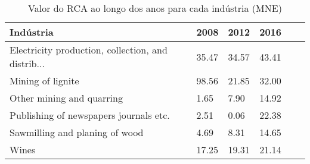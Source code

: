 \begin{table}
\centering
\caption{Valor do RCA ao longo dos anos para cada indústria (MNE)}
\label{tab:ex3-tempo-MNE}
\begin{tabular}{p{6cm}p{1.5cm}p{1.5cm}p{1.5cm}p{1.5cm}p{1.5cm}}
\toprule
                                         Indústria &  2008 &  2012 &  2016 \\
\midrule
Electricity production, collection, and distrib... & 35.47 & 34.57 & 43.41 \\
                                 Mining of lignite & 98.56 & 21.85 & 32.00 \\
                         Other mining and quarring &  1.65 &  7.90 & 14.92 \\
            Publishing of newspapers journals etc. &  2.51 &  0.06 & 22.38 \\
                    Sawmilling and planing of wood &  4.69 &  8.31 & 14.65 \\
                                             Wines & 17.25 & 19.31 & 21.14 \\
\bottomrule
\end{tabular}
\end{table}
